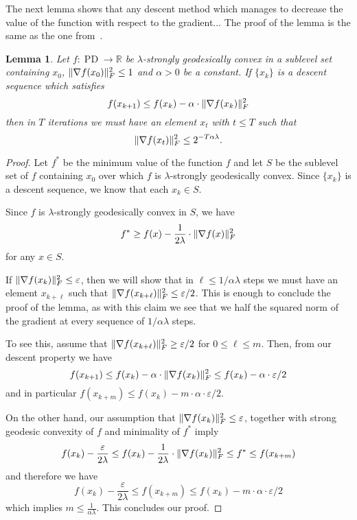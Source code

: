\documentclass{article}
\newtheorem{lemma}[theorem]{Lemma}
\DeclarePairedDelimiter{\norm}{\lVert}{\rVert}
\newcommand{\R}{{\mathbb{R}}}
\newcommand\PD{\operatorname{PD}}
\begin{document}
The next lemma shows that any descent method which manages to decrease the value of the function with respect to the gradient...
The proof of the lemma is the same as the one from~\cite[Lemma 4.8]{FM20}.

\begin{lemma}\label{lem:descent-sublevel-set}
	Let $f : \PD \rightarrow \R$ be $\lambda$-strongly geodesically convex in a sublevel set containing $x_0$, $\norm{\nabla f(x_0)}_F^2 \leq 1$ and $\alpha > 0$ be a constant.
	If $\{x_k\}$ is a descent sequence which satisfies 
	$$ f(x_{k+1}) \leq f(x_k) - \alpha \cdot \norm{\nabla f(x_k)}^2_F $$
	then in $T$ iterations we must have an element $x_t$ with $t\leq T$ such that
	$$ \norm{\nabla f(x_t)}^2_F \leq 2^{-T \alpha \lambda}.   $$
\end{lemma}

\begin{proof}
	Let $f^*$ be the minimum value of the function $f$ and let $S$ be the sublevel set of $f$ containing $x_0$ over which $f$ is $\lambda$-strongly geodesically convex. Since $\{x_k\}$ is a descent sequence, we know that each $x_k \in S$.
	
	Since $f$ is $\lambda$-strongly geodesically convex in $S$, we have 
	$$ f^* \geq f(x) - \frac{1}{2\lambda} \cdot \norm{\nabla f(x)}_F^2 $$
	for any $x \in S$.
	
	If $\norm{\nabla f(x_k)}_F^2 \leq \varepsilon$, then we will show that in $\ell \leq 1/\alpha \lambda$ steps we must have an element $x_{k+\ell}$ such that $\norm{\nabla f(x_{k + \ell})}_F^2 \leq \varepsilon/2$. This is enough to conclude the proof of the lemma, as with this claim we see that we half the squared norm of the gradient at every sequence of $1/\alpha \lambda$ steps.
	
	To see this, assume that $\norm{\nabla f(x_{k+\ell})}_F^2 \geq \varepsilon/2$ for $0 \leq \ell \leq m$. Then, from our descent property we have
	$$ f(x_{k+1}) \leq f(x_k) - \alpha \cdot \norm{\nabla f(x_k)}^2_F \leq f(x_k) - \alpha \cdot \varepsilon/2$$
	and in particular $f(x_{k + m}) \leq f(x_k) - m \cdot \alpha \cdot \varepsilon/2$. 
	
	On the other hand, our assumption that $\norm{\nabla f(x_k)}_F^2 \leq \varepsilon$, together with strong geodesic convexity of $f$ and minimality of $f^*$ imply 
	$$ f(x_{k}) - \frac{\varepsilon}{2\lambda} \leq f(x_{k}) - \frac{1}{2\lambda} \cdot \norm{\nabla f(x_k)}_F^2 \leq f^* \leq f(x_{k+m}) $$ 
	and therefore we have
	$$ f(x_{k}) - \frac{\varepsilon}{2\lambda} \leq f(x_{k + m}) \leq f(x_k) - m \cdot \alpha \cdot \varepsilon/2 $$
	which implies $m \leq \frac{1}{\alpha \lambda}$. This concludes our proof.
\end{proof}
\end{document}
